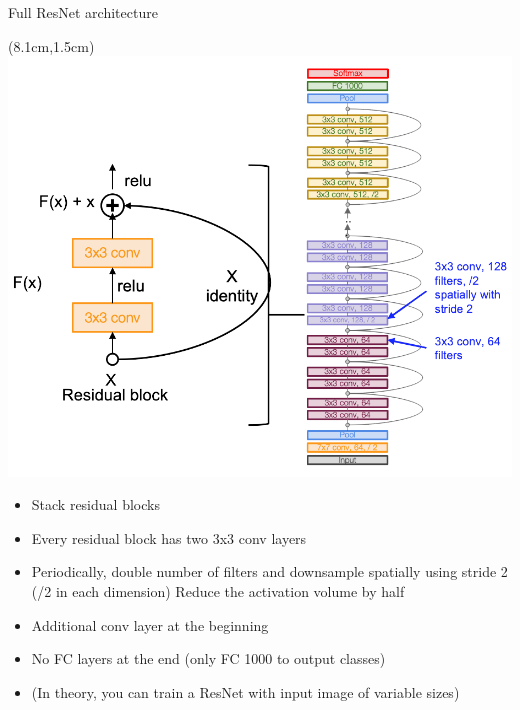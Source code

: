 \documentclass[serif, aspectratio=169]{beamer}
\begin{document}
\begin{frame}{Full ResNet architecture}
	\begin{textblock*}{5cm}(8.1cm,1.5cm) %
		\includegraphics[keepaspectratio, scale=0.24]{pic/res_arch}
	\end{textblock*}
	
	\begin{itemize}
		\item Stack residual blocks
		\item Every residual block has two 3x3 conv layers
		\item Periodically, double number of filters \newline and downsample spatially using \newline stride 2 (/2 in each dimension) Reduce \newline the activation volume by half
		\item Additional conv layer at the beginning
		\item No FC layers at the end (only FC 1000 \newline to output classes)
		\item (In theory, you can train a ResNet with \newline input image of variable sizes)
	\end{itemize}
\end{frame}
\end{document}

